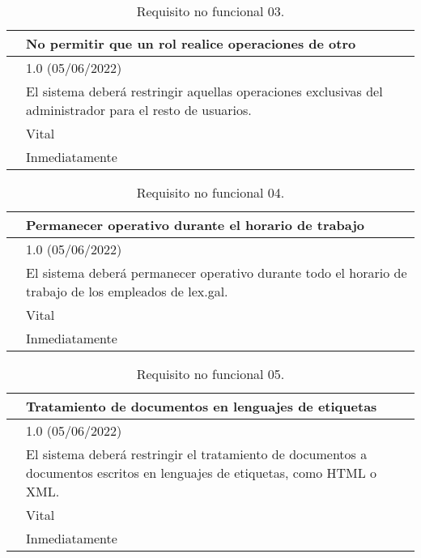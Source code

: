 \begin{table}[H]
\begin{center}
\begin{tabular}{|p{3cm}|p{10cm}|} \hline
\centering {\bf NFR-03} & No permitir que un rol realice operaciones de otro  \\ \hline\hline
\centering {\bf Versión} & 1.0 (05/06/2022) \\ \hline
\centering {\bf Descripción} & El sistema deberá restringir aquellas operaciones exclusivas del administrador para el resto de usuarios. \\ \hline
\centering {\bf Importancia} & Vital \\ \hline
\centering {\bf Urgencia} & Inmediatamente \\ \hline
\end{tabular}
\caption{Requisito no funcional 03.}
\label{enlaceNFR3}
\end{center}
\end{table}

\begin{table}[H]
\begin{center}
\begin{tabular}{|p{3cm}|p{10cm}|} \hline
\centering {\bf NFR-04} & Permanecer operativo durante el horario de trabajo \\ \hline\hline
\centering {\bf Versión} & 1.0 (05/06/2022) \\ \hline
\centering {\bf Descripción} & El sistema deberá permanecer operativo durante todo el horario de trabajo de los empleados de lex.gal.  \\ \hline
\centering {\bf Importancia} & Vital \\ \hline
\centering {\bf Urgencia} & Inmediatamente \\ \hline
\end{tabular}
\caption{Requisito no funcional 04.}
\label{enlaceNFR4}
\end{center}
\end{table}

\begin{table}[H]
\begin{center}
\begin{tabular}{|p{3cm}|p{10cm}|} \hline
\centering {\bf NFR-05} & Tratamiento de documentos en lenguajes de etiquetas  \\ \hline\hline
\centering {\bf Versión} & 1.0 (05/06/2022) \\ \hline
\centering {\bf Descripción} & El sistema deberá restringir el tratamiento de documentos a documentos escritos en lenguajes de etiquetas, como HTML o XML. \\ \hline
\centering {\bf Importancia} & Vital \\ \hline
\centering {\bf Urgencia} & Inmediatamente \\ \hline
\end{tabular}
\caption{Requisito no funcional 05.}
\label{enlaceNFR5}
\end{center}
\end{table}

